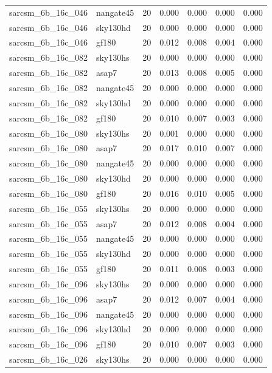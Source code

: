 \begin{tabular}{llrrrrr}
sarcsm\_6b\_16c\_046 & nangate45 & 20 & 0.000 & 0.000 & 0.000 & 0.000 \\
sarcsm\_6b\_16c\_046 & sky130hd & 20 & 0.000 & 0.000 & 0.000 & 0.000 \\
sarcsm\_6b\_16c\_046 & gf180 & 20 & 0.012 & 0.008 & 0.004 & 0.000 \\
sarcsm\_6b\_16c\_082 & sky130hs & 20 & 0.000 & 0.000 & 0.000 & 0.000 \\
sarcsm\_6b\_16c\_082 & asap7 & 20 & 0.013 & 0.008 & 0.005 & 0.000 \\
sarcsm\_6b\_16c\_082 & nangate45 & 20 & 0.000 & 0.000 & 0.000 & 0.000 \\
sarcsm\_6b\_16c\_082 & sky130hd & 20 & 0.000 & 0.000 & 0.000 & 0.000 \\
sarcsm\_6b\_16c\_082 & gf180 & 20 & 0.010 & 0.007 & 0.003 & 0.000 \\
sarcsm\_6b\_16c\_080 & sky130hs & 20 & 0.001 & 0.000 & 0.000 & 0.000 \\
sarcsm\_6b\_16c\_080 & asap7 & 20 & 0.017 & 0.010 & 0.007 & 0.000 \\
sarcsm\_6b\_16c\_080 & nangate45 & 20 & 0.000 & 0.000 & 0.000 & 0.000 \\
sarcsm\_6b\_16c\_080 & sky130hd & 20 & 0.000 & 0.000 & 0.000 & 0.000 \\
sarcsm\_6b\_16c\_080 & gf180 & 20 & 0.016 & 0.010 & 0.005 & 0.000 \\
sarcsm\_6b\_16c\_055 & sky130hs & 20 & 0.000 & 0.000 & 0.000 & 0.000 \\
sarcsm\_6b\_16c\_055 & asap7 & 20 & 0.012 & 0.008 & 0.004 & 0.000 \\
sarcsm\_6b\_16c\_055 & nangate45 & 20 & 0.000 & 0.000 & 0.000 & 0.000 \\
sarcsm\_6b\_16c\_055 & sky130hd & 20 & 0.000 & 0.000 & 0.000 & 0.000 \\
sarcsm\_6b\_16c\_055 & gf180 & 20 & 0.011 & 0.008 & 0.003 & 0.000 \\
sarcsm\_6b\_16c\_096 & sky130hs & 20 & 0.000 & 0.000 & 0.000 & 0.000 \\
sarcsm\_6b\_16c\_096 & asap7 & 20 & 0.012 & 0.007 & 0.004 & 0.000 \\
sarcsm\_6b\_16c\_096 & nangate45 & 20 & 0.000 & 0.000 & 0.000 & 0.000 \\
sarcsm\_6b\_16c\_096 & sky130hd & 20 & 0.000 & 0.000 & 0.000 & 0.000 \\
sarcsm\_6b\_16c\_096 & gf180 & 20 & 0.010 & 0.007 & 0.003 & 0.000 \\
sarcsm\_6b\_16c\_026 & sky130hs & 20 & 0.000 & 0.000 & 0.000 & 0.000 \\

\end{tabular}
